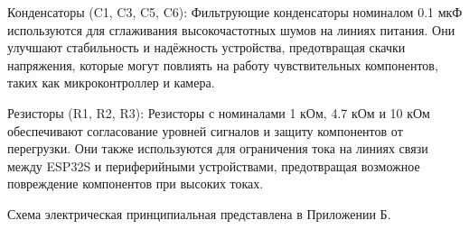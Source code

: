     Конденсаторы (C1, C3, C5, C6): Фильтрующие конденсаторы 
номиналом 0.1 мкФ используются для сглаживания высокочастотных 
шумов на линиях питания. Они улучшают стабильность и надёжность 
устройства, предотвращая скачки напряжения, которые могут 
повлиять на работу чувствительных компонентов, таких как 
микроконтроллер и камера.

    Резисторы (R1, R2, R3): Резисторы с номиналами 1 кОм, 4.7 кОм 
и 10 кОм обеспечивают согласование уровней сигналов и защиту 
компонентов от перегрузки. Они также используются для ограничения 
тока на линиях связи между ESP32S и периферийными устройствами, 
предотвращая возможное повреждение компонентов при высоких 
токах.

Схема электрическая принципиальная представлена в Приложении Б.
